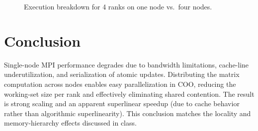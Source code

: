 \documentclass[twocolumn]{article}
\begin{document}
\begin{figure}[H]
\centering
{}
\caption{Execution breakdown for 4 ranks on one node vs.~four nodes.}
\label{fig:breakdown}
\end{figure}

\section{Conclusion}

Single-node MPI performance degrades due to bandwidth limitations, cache-line underutilization, and serialization of atomic updates. Distributing the matrix computation across nodes enables easy parallelization in COO, reducing the working-set size per rank and effectively eliminating shared contention. The result is strong scaling and an apparent superlinear speedup (due to cache behavior rather than algorithmic superlinearity). This conclusion matches the locality and memory-hierarchy effects discussed in class.
\end{document}
